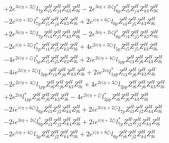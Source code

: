 \begin{align}
 &+2 e^{3 i \Big(\eta +2 \zeta \Big)} l_{7p} Z_{{i 5}}^{H} Z_{{j 4}}^{H} Z_{{k 3}}^{H} Z_{{l 6}}^{H} -2 e^{3 i \eta +2 i \zeta } l_{6p}^* Z_{{i 5}}^{H} Z_{{j 4}}^{H} Z_{{k 3}}^{H} Z_{{l 6}}^{H} \nonumber \\ 
 &-2 e^{i \Big(\eta +2 \zeta \Big)} l_{7p}^* Z_{{i 5}}^{H} Z_{{j 4}}^{H} Z_{{k 3}}^{H} Z_{{l 6}}^{H} +2 e^{i \Big(\eta +6 \zeta \Big)} l_{6p} Z_{{i 4}}^{H} Z_{{j 5}}^{H} Z_{{k 3}}^{H} Z_{{l 6}}^{H} \nonumber \\ 
 &+2 e^{3 i \Big(\eta +2 \zeta \Big)} l_{7p} Z_{{i 4}}^{H} Z_{{j 5}}^{H} Z_{{k 3}}^{H} Z_{{l 6}}^{H} -2 e^{3 i \eta +2 i \zeta } l_{6p}^* Z_{{i 4}}^{H} Z_{{j 5}}^{H} Z_{{k 3}}^{H} Z_{{l 6}}^{H} \nonumber \\ 
 &-2 e^{i \Big(\eta +2 \zeta \Big)} l_{7p}^* Z_{{i 4}}^{H} Z_{{j 5}}^{H} Z_{{k 3}}^{H} Z_{{l 6}}^{H} +4 e^{2 i \Big(\eta +3 \zeta \Big)} l_{5p} Z_{{i 5}}^{H} Z_{{j 5}}^{H} Z_{{k 3}}^{H} Z_{{l 6}}^{H} \nonumber \\ 
 &-4 e^{2 i \Big(\eta +\zeta \Big)} l_{5p}^* Z_{{i 5}}^{H} Z_{{j 5}}^{H} Z_{{k 3}}^{H} Z_{{l 6}}^{H} +2 i e^{2 i \Big(\eta +4 \zeta \Big)} l_{1pp} Z_{{i 3}}^{H} Z_{{j 6}}^{H} Z_{{k 3}}^{H} Z_{{l 6}}^{H} \nonumber \\ 
 &-4 i e^{2 i \Big(\eta +2 \zeta \Big)} l_{3pp} Z_{{i 3}}^{H} Z_{{j 6}}^{H} Z_{{k 3}}^{H} Z_{{l 6}}^{H} +2 i e^{2 i \eta } l_{1pp}^* Z_{{i 3}}^{H} Z_{{j 6}}^{H} Z_{{k 3}}^{H} Z_{{l 6}}^{H} \nonumber \\ 
 &-2 e^{2 i \Big(\eta +4 \zeta \Big)} l_{1pp} Z_{{i 6}}^{H} Z_{{j 6}}^{H} Z_{{k 3}}^{H} Z_{{l 6}}^{H} +4 e^{2 i \Big(\eta +3 \zeta \Big)} l_{2pp} Z_{{i 6}}^{H} Z_{{j 6}}^{H} Z_{{k 3}}^{H} Z_{{l 6}}^{H} \nonumber \\ 
 &+2 e^{2 i \eta } l_{1pp}^* Z_{{i 6}}^{H} Z_{{j 6}}^{H} Z_{{k 3}}^{H} Z_{{l 6}}^{H} -4 e^{2 i \Big(\eta +\zeta \Big)} l_{2pp}^* Z_{{i 6}}^{H} Z_{{j 6}}^{H} Z_{{k 3}}^{H} Z_{{l 6}}^{H} \nonumber \\ 
 &-2 i e^{i \Big(\eta +6 \zeta \Big)} l_{6p} Z_{{i 3}}^{H} Z_{{j 2}}^{H} Z_{{k 4}}^{H} Z_{{l 6}}^{H} +2 i e^{3 i \Big(\eta +2 \zeta \Big)} l_{7p} Z_{{i 3}}^{H} Z_{{j 2}}^{H} Z_{{k 4}}^{H} Z_{{l 6}}^{H} \nonumber \\ 
 &-2 i e^{3 i \eta +2 i \zeta } l_{6p}^* Z_{{i 3}}^{H} Z_{{j 2}}^{H} Z_{{k 4}}^{H} Z_{{l 6}}^{H} +2 i e^{i \Big(\eta +2 \zeta \Big)} l_{7p}^* Z_{{i 3}}^{H} Z_{{j 2}}^{H} Z_{{k 4}}^{H} Z_{{l 6}}^{H} \nonumber \\ 
 &-2 e^{i \Big(\eta +4 \zeta \Big)} l_{3p} Z_{{i 6}}^{H} Z_{{j 2}}^{H} Z_{{k 4}}^{H} Z_{{l 6}}^{H} +2 e^{i \Big(\eta +6 \zeta \Big)} l_{6p} Z_{{i 6}}^{H} Z_{{j 2}}^{H} Z_{{k 4}}^{H} Z_{{l 6}}^{H} \nonumber \\ 

\end{align}
